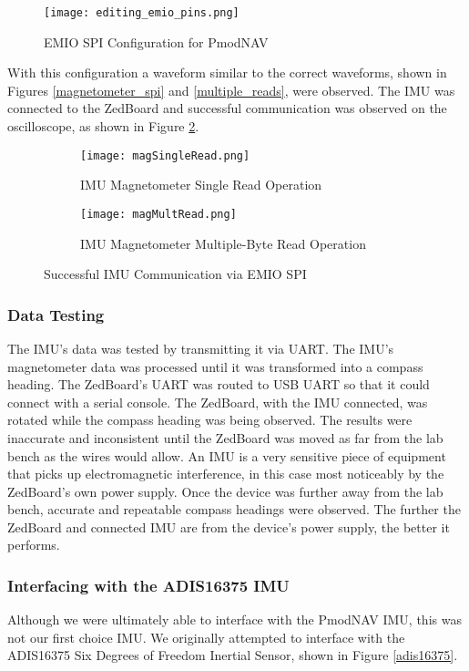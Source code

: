 \begin{figure}[H]
	\centerline{\texttt{[image: editing\_emio\_pins.png]}}
	\caption{EMIO SPI Configuration for PmodNAV}
	\label{emio_config}
\end{figure}

With this configuration a waveform similar to the correct waveforms, shown in Figures \ref{magnetometer_spi} and \ref{multiple_reads}, were observed. The IMU was connected to the ZedBoard and successful communication was observed on the oscilloscope, as shown in Figure \ref{OTPHJ}.

\begin{figure}[H] 
	\begin{subfigure}{1\textwidth}
	\centering
		\texttt{[image: magSingleRead.png]}
		\caption{IMU Magnetometer Single Read Operation}
	\end{subfigure}
	\begin{subfigure}{1\textwidth}
	\centering
		\texttt{[image: magMultRead.png]}
		\caption{IMU Magnetometer Multiple-Byte Read Operation}
	\end{subfigure}
	\caption{Successful IMU Communication via EMIO SPI}
	\label{OTPHJ}
\end{figure}

\subsubsection{Data Testing}
The IMU's data was tested by transmitting it via UART. The IMU's magnetometer data was processed until it was transformed into a compass heading. The ZedBoard's UART was routed to USB UART so that it could connect with a serial console. The ZedBoard, with the IMU connected, was rotated while the compass heading was being observed. The results were inaccurate and inconsistent until the ZedBoard was moved as far from the lab bench as the wires would allow. An IMU is a very sensitive piece of equipment that picks up electromagnetic interference, in this case most noticeably by the ZedBoard's own power supply. Once the device was further away from the lab bench, accurate and repeatable compass headings were observed. The further the ZedBoard and connected IMU are from the device's power supply, the better it performs.

\subsubsection{Interfacing with the ADIS16375 IMU}
Although we were ultimately able to interface with the PmodNAV IMU, this was not our first choice IMU. We originally attempted to interface with the ADIS16375 Six Degrees of Freedom Inertial Sensor, shown in Figure \ref{adis16375}.

